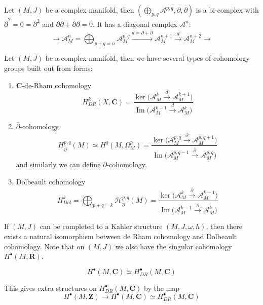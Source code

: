 \documentclass[
11pt, %
letterpaper， %
oneside, %
headinclude,footinclude, %
BCOR5mm, %
]{scrartcl}
\newcommand{\Z}{{\mathbf{Z}}}
\newcommand{\R}{{\mathbf{R}}}
\newcommand{\C}{{\mathbf{C}}}
\newcommand{\im}{\operatorname{Im}}
\begin{document}
Let $(M,J )$ be a complex manifold, then $(\bigoplus_{p,q}\mathcal{A}^{p,q}, \partial, \overline{\partial})$ is a bi-complex with $\overline{\partial}^2=0=\partial^2$ and $\partial\overline{\partial}+\overline{\partial}\partial=0$. It has a diagonal complex $\mathcal{A}^n$:
\begin{equation*}
	\longrightarrow \mathcal{A}^n_{M}=\bigoplus_{p+q=n}\mathcal{A}_M^{p,q}\stackrel{d=\partial+\overline{\partial}}{\longrightarrow} \mathcal{A}^{n+1}_{M}\stackrel{d}{\longrightarrow} \mathcal{A}^{n+2}_{M}\longrightarrow
\end{equation*}


\begin{definition}
	Let $(M,J)$ be a complex manifold, then we have several types of cohomology groups built out from forms:
	\begin{enumerate}
		\item {$\C$-de-Rham cohomology}
		\begin{equation*}
		H^k_{DR}(X,\C)=  \frac{\ker \big(\mathcal{A}^{k}_{M}\stackrel{d}{\longrightarrow} \mathcal{A}^{k+1}_{M} \big)}{\im \big(\mathcal{A}^{k-1}_{M}\stackrel{d}{\longrightarrow} \mathcal{A}^{k}_{M}\big) }
		\end{equation*}
		\item $\overline{\partial}$-cohomology
		\begin{equation*}
		H^{p,q}_{\overline{\partial}}(M)\simeq H^q(M,\Omega^p_M)= \frac{\ker \big(\mathcal{A}^{p,q}_{M}\stackrel{\overline{\partial}}{\longrightarrow} \mathcal{A}^{p,q+1}_{M} \big)}{\im \big(\mathcal{A}^{p,q-1}_{M}\stackrel{\overline{\partial}}{\longrightarrow} \mathcal{A}^{p,q}_{M}\big) }
		\end{equation*}
		and similarly we can define $\partial$-cohomology.
		\item Dolbeault cohomology
		\begin{equation*}
		H^k_{Dol}=\bigoplus_{p+q=k}\mathcal{H}_{\overline{\partial}}^{p,q}(M)=\frac{\ker \big(\mathcal{A}^{k}_{M}\stackrel{\overline{\partial}}{\longrightarrow} \mathcal{A}^{k+1}_{M} \big)}{\im \big(\mathcal{A}^{k-1}_{M}\stackrel{\overline{\partial}}{\longrightarrow} \mathcal{A}^{k}_{M}\big) }
		\end{equation*}
 	\end{enumerate} 
\end{definition}
If $(M,J)$ can be completed to a Kahler structure $(M,J,\omega,h)$, then there exists a natural isomorphism between  de Rham cohomology and Dolbeault cohomology. Note that on $(M,J)$ we also have the singular cohomology $H^{\bullet}(M,\R)$.
\begin{thm}[de Rham]
	\begin{equation*}
	H^{\bullet}(M,\C)\simeq H^{\bullet}_{DR}(M,\C)
	\end{equation*}
\end{thm}This gives extra structures on $H^{\bullet}_{DR}(M,\C)$ by the map
\begin{equation*}
H^{\bullet}(M,\Z)\to H^{\bullet}(M,\C)\simeq H^{\bullet}_{DR}(M,\C)
\end{equation*}
\end{document}
